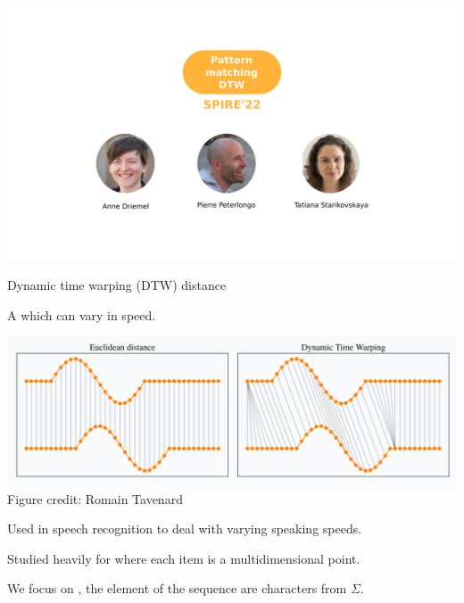 
\newcommand{\dtw}{\mathrm{DTW}}
\newcommand{\ed}{\mathrm{ED}}
\newcommand{\RLE}{\mathrm{RLE}}

\begin{frame}
    \includegraphics[width=\textwidth]{pictures/mindmap/dtw.png}
\end{frame}


\begin{frame}{Dynamic time warping (DTW) distance }

A  which can vary in speed.

\begin{center}
\includegraphics[scale=0.3]{figures/dtw_vs_euc.png}\\
\footnotesize{Figure credit: Romain Tavenard}
\end{center}
\pause
Used in speech recognition to deal with varying speaking speeds.\pause

Studied heavily for  where each item is a multidimensional point.

We focus on , the element of the sequence are characters from $\Sigma$.

\end{frame}

